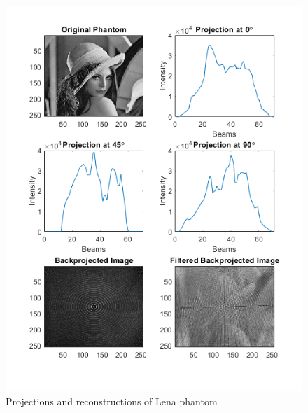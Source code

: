 \documentclass[journal]{IEEEtran}
\begin{document}
\begin{figure}[h]
\centering
\includegraphics[width=\columnwidth,height=.3\textheight]{images/lenaprojected.png}
\caption{Projections and reconstructions of Lena phantom}\label{fig:lenaprojected}
\end{figure}
\end{document}
